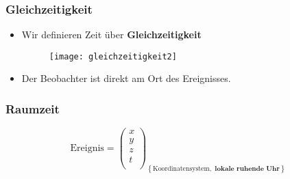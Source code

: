 \documentclass[]{beamer}%
\newcommand{\drawBasis}[5]{%
    \tikzmath{  \sLW=#2;}
    \draw[line width=1pt*\sLW,->] (0,0,0) -- (1,0,0) node[scale=#1, anchor=north east]{$#3$};
    \draw[line width=1pt*\sLW,->] (0,0,0) -- (0,1,0) node[scale=#1, anchor=south]{$#4$};
    \draw[line width=1pt*\sLW,->] (0,0,0) -- (0,0,1) node[scale=#1, anchor=south]{$#5$};
}
\newcommand{\clock}[6]{%
    \begin{scope}[xshift=#1, yshift=#2, scale=#3, line cap=round]
        \tikzmath{
            \sLW = #4;  %
        } 
        \draw [line width=1.6pt*\sLW] (0,0) circle (1.15cm);
        \foreach \angle in {0, 30, ..., 330} 
            \draw[line width=1pt*\sLW] (\angle:0.89cm) -- (\angle:1cm);
        \foreach \angle in {0,90,180,270}
            \draw[line width=1.4pt*\sLW] (\angle:0.82cm) -- (\angle:1cm);
        \draw[line width=1.6pt*\sLW] (0,0) -- (90-30*#5:0.4cm); %
        \draw[line width=1.3pt*\sLW] (0,0) -- (90-6*#6:0.65cm); %
    \end{scope}
}
\newcommand{\guy}[4]{%
    \begin{scope}[xshift=#1,yshift=#2,scale=#3]
        \tikzmath{
            \sLW = #4;  %
        } 
        \draw[line width=2pt*\sLW] (0,0) circle (1cm);               %
        \draw[fill=black] (35:0.3cm) circle (0.08cm*\sLW);           %
        \draw[fill=black] (145:0.3cm) circle (0.08cm*\sLW);          %
        \draw[line width=2pt*\sLW] ([shift={+(0cm,0cm)}]245:0.5cm) arc (245:295:0.5cm);
        
        \draw[line width=2pt*\sLW] (0,-1cm) -- ++(-90:2.25cm);       %
        \draw[line width=2pt*\sLW] (0,-2cm) -- ++(30:1.5cm);         %
        \draw[line width=2pt*\sLW] (0,-2cm) -- ++(150:1.5cm);        %
        \draw[line width=2pt*\sLW] (0,-3.25cm) -- ++(-60:1.5cm);     %
        \draw[line width=2pt*\sLW] (0,-3.25cm) -- ++(240:1.5cm);     %
    \end{scope}
}
\newcommand{\rail}[5]{%
    \begin{scope}[xshift=#1, yshift=#2, scale=#3]
        \tikzmath{
            \sLW = #4;
        }
        \draw[line width=2pt*\sLW] (-0.1cm,0) -- (#5,0);
        \draw[line width=1pt*\sLW, dashed] (0,-0.1cm) node[below]{Ziel} -- (0,2cm) ;
    \end{scope}
}
\newcommand{\locomotive}[4]{%
    \begin{scope}[xshift=#1, yshift=#2, scale=#3]
        \tikzmath{
            \sLW = #4;
        }
        \draw[line width=2pt*\sLW] (0,0.3cm) 
            -- ++(6cm,  0) 
            -- ++(0,    1.4cm) 
            -- ++(-5cm, 0) 
            --   (0,    0.3cm);
        \draw[line width=2pt*\sLW] (0.5cm,0.9cm) -- ++(1.5cm,0) -- (2.0cm,1.7cm); 
        \foreach \wheel in {1,2,3.5,4.5,5.5}{
            \draw [line width=2pt*\sLW]([shift={(\wheel,0.3cm)}]180:0.3cm) arc (180:360:0.3cm);
        }
    \end{scope}
}
\newcommand{\railCar}[4]{%
    \begin{scope}[xshift=#1, yshift=#2, scale=#3]
        \tikzmath{
            \sLW = #4;
        } 
        \draw[line width=2pt*\sLW] 
                  (0,   0.3cm) 
            --  ++(5cm, 0)
            --  ++(0,   1.4cm)
            --  ++(-5cm,0)
            --    (0,   0.3cm);
        \foreach \wheel in {0.8,1.8,3.2,4.2}{
            \draw [line width=2pt*\sLW]
                ([shift={(\wheel,0.3cm)}]180:0.3cm) arc (180:360:0.3cm);
        }
    \end{scope}
}
\newcommand{\train}[4]{%
    \begin{scope}[shift={++(#1,#2)}, scale=#3]
        \rail{0}{0}{#3}{#4}{11.5cm};
        \locomotive{0}{0}{#3}{#4}; 
        \railCar{6.5cm*#3}{0}{#3}{#4};
    \end{scope}
}
\newcommand{\spaceTime}[9]{%
    \begin{scope}[xshift=#1, yshift=#2, scale=#3]
        \tdplotsetmaincoords{55}{30}
        \begin{scope}[scale=1, tdplot_main_coords]
            \drawBasis{#5}{#4}{#6}{#7}{#8}
            \begin{scope}[scale=2]
                \clock{0.43cm}{0.1cm}{0.15}{0.8*#4}{9}{5};
                \begin{scope}[xshift=0.7cm, yshift=0]    
                    \node[scale=#5](0,0){$#9$};
                \end{scope}
            \end{scope}
        \end{scope}
        \tdplotsetmaincoords{0}{0}
    \end{scope}
}
\begin{document}
\begin{frame}[fragile]
    \frametitle{Gleichzeitigkeit}
    \begin{figure}[h]
        \centering
    \end{figure}

\end{frame}

\begin{frame}
    \begin{itemize}
        \item   Wir definieren Zeit über \textbf{Gleichzeitigkeit}\\
            \vspace{5pt}
            \begin{figure}[h]
                    \centering
                    \texttt{[image: gleichzeitigkeit2]}\\
                    \caption{\cite{Einstein1905}}
            \end{figure}
            \vspace{5pt}
        \item   Der Beobachter ist direkt am Ort des Ereignisses.
    \end{itemize}
\end{frame}

\begin{frame}
    \frametitle{Raumzeit}
    \begin{figure}[h]
        \centering
        \begin{equation*}
            \text{Ereignis} = 
                \begin{pmatrix} 
                    x\\
                    y\\
                    z\\
                    t\\
                \end{pmatrix}_{ \left\{
                    \text{Koordinatensystem}, \textbf{ lokale ruhende Uhr}
                                \right\}}
        \end{equation*}
    \end{figure}        
\end{frame}
\end{document}
